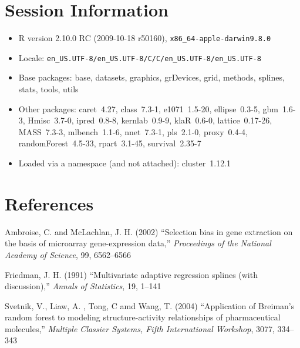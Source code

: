 \documentclass[12pt]{article}
\begin{document}
\section{Session Information}

\begin{itemize}\raggedright
  \item R version 2.10.0 RC (2009-10-18 r50160), \verb|x86_64-apple-darwin9.8.0|
  \item Locale: \verb|en_US.UTF-8/en_US.UTF-8/C/C/en_US.UTF-8/en_US.UTF-8|
  \item Base packages: base, datasets, graphics, grDevices, grid,
    methods, splines, stats, tools, utils
  \item Other packages: caret~4.27, class~7.3-1, e1071~1.5-20,
    ellipse~0.3-5, gbm~1.6-3, Hmisc~3.7-0, ipred~0.8-8, kernlab~0.9-9,
    klaR~0.6-0, lattice~0.17-26, MASS~7.3-3, mlbench~1.1-6, nnet~7.3-1,
    pls~2.1-0, proxy~0.4-4, randomForest~4.5-33, rpart~3.1-45,
    survival~2.35-7
  \item Loaded via a namespace (and not attached): cluster~1.12.1
\end{itemize}
\section{References}

\begin{description}    
  \item Ambroise, C. and McLachlan, J. H. (2002) ``Selection bias in gene extraction on the basis of microarray gene-expression data,'' {\it Proceedings of the National Academy of Science}, 99, 6562--6566
  
  \item Friedman, J. H. (1991) ``Multivariate adaptive regression splines (with discussion),'' {\it Annals of Statistics}, 19, 1--141
  \item  Svetnik, V., Liaw, A. , Tong, C amd Wang, T. (2004) ``Application of Breiman's random forest to modeling structure-activity relationships of pharmaceutical molecules,'' {\it Multiple Classier Systems, Fifth International Workshop}, 3077, 334--343
  \end{description}
\end{document}
